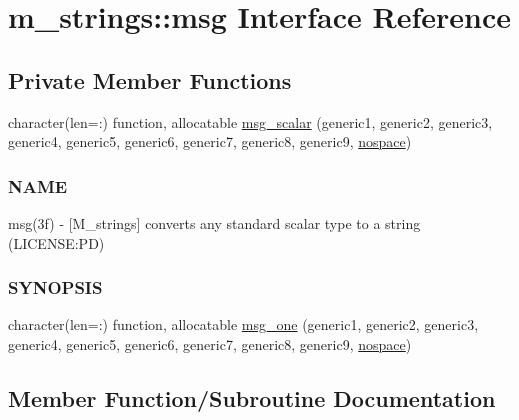 \hypertarget{interfacem__strings_1_1msg}{}\section{m\+\_\+strings\+:\+:msg Interface Reference}
\label{interfacem__strings_1_1msg}
\subsection*{Private Member Functions}
\begin{DoxyCompactItemize}
\item 
character(len=\+:) function, allocatable \mbox{\hyperlink{interfacem__strings_1_1msg_a087c0599aee7792fc0c49bd42ee4813c}{msg\+\_\+scalar}} (generic1, generic2, generic3, generic4, generic5, generic6, generic7, generic8, generic9, \mbox{\hyperlink{namespacem__strings_ad007f050abe3d142f4a7badbc4408685}{nospace}})
\begin{DoxyCompactList}\small\item\em \subsubsection*{N\+A\+ME}

msg(3f) -\/ \mbox{[}M\+\_\+strings\mbox{]} converts any standard scalar type to a string (L\+I\+C\+E\+N\+SE\+:PD) \subsubsection*{S\+Y\+N\+O\+P\+S\+IS}\end{DoxyCompactList}\item 
character(len=\+:) function, allocatable \mbox{\hyperlink{interfacem__strings_1_1msg_a5e777cc04483b18e88cffa8683e7ac9d}{msg\+\_\+one}} (generic1, generic2, generic3, generic4, generic5, generic6, generic7, generic8, generic9, \mbox{\hyperlink{namespacem__strings_ad007f050abe3d142f4a7badbc4408685}{nospace}})
\end{DoxyCompactItemize}


\subsection{Member Function/\+Subroutine Documentation}
\mbox{\label{interfacem__strings_1_1msg_a5e777cc04483b18e88cffa8683e7ac9d}} 
